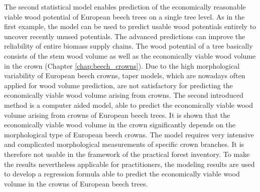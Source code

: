 The second statistical model enables prediction of the economically reasonable viable wood potential of European beech trees on a single tree level. As in the first example, the model can be used to predict usable wood potentials entirely to uncover recently unused potentials. The advanced predictions can improve the reliability of entire biomass supply chains. The wood potential of a tree basically consists of the stem wood volume as well as the economically viable wood volume in the crown (Chapter \ref{chap:beech_crowns}). Due to the high morphological variability of European beech crowns, taper models, which are nowadays often applied for wood volume prediction, are not satisfactory for predicting the economically viable wood volume arising from crowns. The second introduced method is a computer aided model, able to predict the economically viable wood volume arising from crowns of European beech trees. It is shown that the economically viable wood volume in the crown significantly depends on the morphological type of European beech crowns. The model requires very intensive and complicated morphological measurements of specific crown branches. It is therefore not usable in the framework of the practical forest inventory. To make the results nevertheless applicable for practitioners, the modeling results are used to develop a regression formula able to predict the economically viable wood volume in the crowns of European beech trees. 

